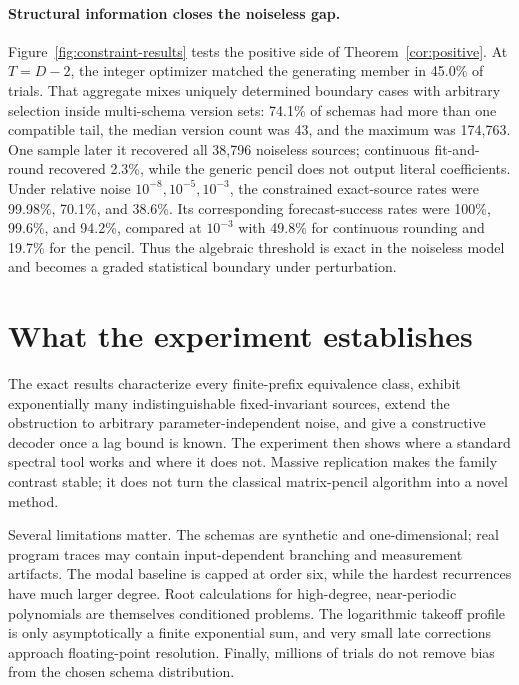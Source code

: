 \documentclass[10pt,twocolumn]{article}
\theoremstyle{cleanprop}
\begin{document}
\paragraph{Structural information closes the noiseless gap.}
Figure~\ref{fig:constraint-results} tests the positive side of
Theorem~\ref{cor:positive}. At $T=D-2$, the integer optimizer matched the
generating member in 45.0\% of trials. That aggregate mixes uniquely determined
boundary cases with arbitrary selection inside multi-schema version sets: 74.1\%
of schemas had more than one compatible tail, the median version count was 43,
and the maximum was 174,763. One sample later it recovered all 38,796 noiseless sources;
continuous fit-and-round recovered 2.3\%, while the generic pencil does not
output literal coefficients. Under relative noise $10^{-8},10^{-5},10^{-3}$,
the constrained exact-source rates were 99.98\%, 70.1\%, and 38.6\%.
Its corresponding forecast-success rates were 100\%, 99.6\%, and 94.2\%,
compared at $10^{-3}$ with 49.8\% for continuous rounding and 19.7\% for the
pencil. Thus the algebraic threshold is exact in the noiseless model and
becomes a graded statistical boundary under perturbation.

\section{What the experiment establishes}

The exact results characterize every finite-prefix equivalence class, exhibit
exponentially many indistinguishable fixed-invariant sources, extend the
obstruction to arbitrary parameter-independent noise, and give a constructive
decoder once a lag bound is known. The experiment then shows where a standard
spectral tool works and where it does not. Massive replication makes the family
contrast stable; it does not turn the classical matrix-pencil algorithm into a
novel method.

Several limitations matter. The schemas are synthetic and one-dimensional;
real program traces may contain input-dependent branching and measurement
artifacts. The modal baseline is capped at order six, while the hardest
recurrences have much larger degree. Root calculations for high-degree,
near-periodic polynomials are themselves conditioned problems. The logarithmic
takeoff profile is only asymptotically a finite exponential sum, and very small
late corrections approach floating-point resolution. Finally, millions of
trials do not remove bias from the chosen schema distribution.
\end{document}

